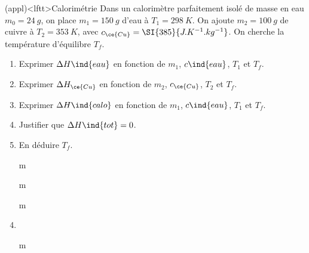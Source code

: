 \documentclass[../../main/main.tex]{subfiles}
\begin{document}
\begin{tcb*}(appl)<lftt>{Calorimétrie}
	Dans un calorimètre parfaitement isolé de masse en eau $m_0 = \SI{24}{g}$, on
	place $m_1 = \SI{150}{g}$ d'eau à $T_1 = \SI{298}{K}$. On ajoute $m_2 =
		\SI{100}{g}$ de cuivre à $T_2 = \SI{353}{K}$, avec $c_{\ce{Cu}} =
		\SI{385}{J.K^{-1}.kg^{-1}}$. On cherche la température d'équilibre $T_f$.
	\begin{enumerate}[label=\sqenumi]
		\item Exprimer $\Delta{H}\ind{eau}$ en fonction de $m_1$, $c\ind{eau}$,
		      $T_1$ et $T_f$.
		\item Exprimer $\Delta{H}_{\ce{Cu}}$ en fonction de $m_2$, $c_{\ce{Cu}}$,
		      $T_2$ et $T_f$.
		\item Exprimer $\Delta{H}\ind{calo}$ en fonction de $m_1$, $c\ind{eau}$,
		      $T_1$ et $T_f$.
		\item Justifier que $\Delta{H}\ind{tot} = 0$.
		\item En déduire $T_f$.
	\end{enumerate}
	\tcblower
	\begin{enumerate}[label=\sqenumi]
		\item[m]
			\vspace{-25pt}
		\item[m]
			\vspace{-25pt}
		\item[m]
			\vspace{-25pt}
		\item {}%
		\item[m]
	\end{enumerate}
	\vspace{-25pt}
\end{tcb*}
\end{document}
